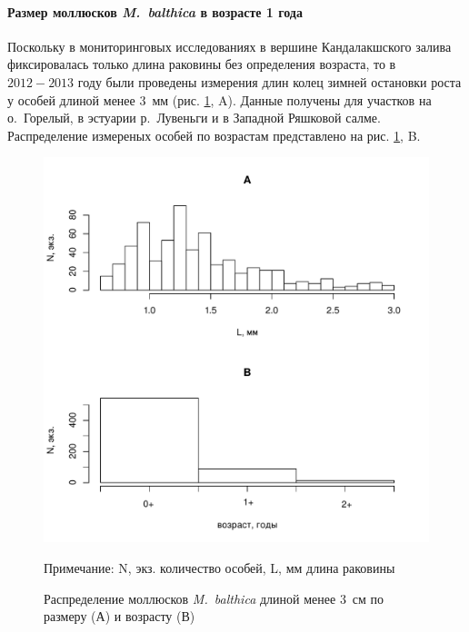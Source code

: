 
	\paragraph{Размер моллюсков {\it M.~balthica} в возрасте 1 года}

Поскольку в мониторинговых исследованиях в вершине Кандалакшского залива фиксировалась только длина раковины без определения возраста, то в $2012 - 2013$ году были проведены  измерения длин колец зимней остановки роста у особей длиной менее $3$~мм (рис. \ref{ris:vozrast_menee_3mm}, A). 
Данные получены для участков на о.~Горелый, в эстуарии р.~Лувеньги и в Западной Ряшковой салме. 
Распределение измереных особей по возрастам представлено на рис. \ref{ris:vozrast_menee_3mm}, B.
	\begin{figure}[p]
		\includegraphics{../White_Sea/growth_young/hist_obili_po_godam1.pdf}
	\caption{Распределение моллюсков {\it M.~balthica} длиной менее $3$~см по размеру (А) и возрасту (В)}
	\label{ris:vozrast_menee_3mm}
	{\footnotesize Примечание: N, экз. \textemdash количество особей, L, мм \textemdash длина раковины}
	\end{figure}

